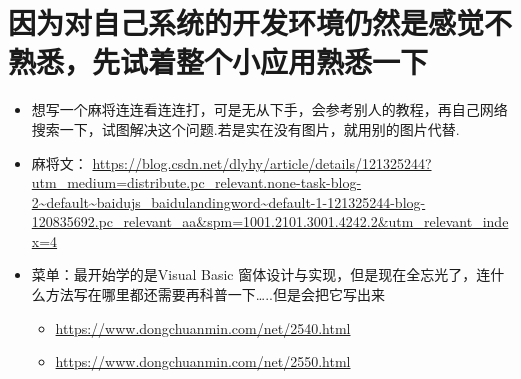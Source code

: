 \documentclass[9pt, b5paper]{article}
\begin{document}
\section{因为对自己系统的开发环境仍然是感觉不熟悉，先试着整个小应用熟悉一下}
\label{sec-8}
\begin{itemize}
\item 想写一个麻将连连看连连打，可是无从下手，会参考别人的教程，再自己网络搜索一下，试图解决这个问题.若是实在没有图片，就用别的图片代替.
\item 麻将文： \url{https://blog.csdn.net/dlyhy/article/details/121325244?utm_medium=distribute.pc_relevant.none-task-blog-2~default~baidujs_baidulandingword~default-1-121325244-blog-120835692.pc_relevant_aa&spm=1001.2101.3001.4242.2&utm_relevant_index=4}
\item 菜单：最开始学的是Visual Basic 窗体设计与实现，但是现在全忘光了，连什么方法写在哪里都还需要再科普一下\ldots{}..但是会把它写出来
\begin{itemize}
\item \url{https://www.dongchuanmin.com/net/2540.html}
\item \url{https://www.dongchuanmin.com/net/2550.html}
\end{itemize}
\end{itemize}
\end{document}
